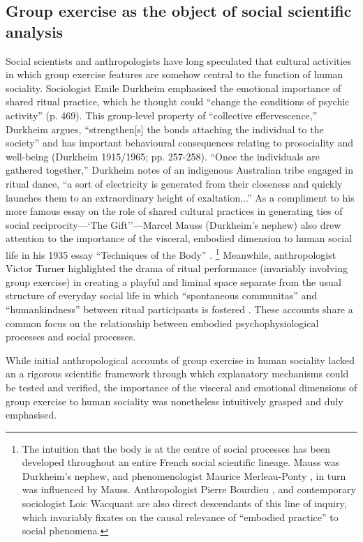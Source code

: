 \begin{CJK}{UTF8}{gbsn}
\subsection{Group exercise as the object of social scientific analysis\label{sect:GEsoSci}}
Social scientists and anthropologists have long speculated that cultural activities in which group exercise features are somehow central to the function of human sociality.  Sociologist Emile Durkheim emphasised the emotional importance of shared ritual practice, which he thought could ``change the conditions of psychic activity'' (p. 469).  This group-level property of ``collective effervescence,'' Durkheim argues, ``strengthen[s] the bonds attaching the individual to the society'' and has important behavioural consequences relating to prosociality and well-being (Durkheim 1915/1965; pp. 257-258). ``Once the individuals are gathered together,'' Durkheim notes of an indigenous Australian tribe engaged in ritual dance, ``a sort of electricity is generated from their closeness and quickly launches them to an extraordinary height of exaltation...''  As a compliment to his more famous essay on the role of shared cultural practices in generating ties of social reciprocity---`The Gift''---Marcel Mauss (Durkheim's nephew) also drew attention to the importance of the visceral, embodied dimension to human social life in his 1935 essay ``Techniques of the Body'' \citep{Mauss1935}.
    \footnote{The intuition that the body is at the centre of social processes has been developed throughout an entire French social scientific lineage.  Mauss was Durkheim's nephew, and phenomenologist Maurice Merleau-Ponty \citep{Merleau-Ponty1956}, in turn was influenced by Mauss.  Anthropologist Pierre Bourdieu \citep{Bourdieu1990}, and contemporary sociologist Loic Wacquant \citep{Wacquant2004} are also direct descendants of this line of inquiry, which invariably fixates on the causal relevance of ``embodied practice'' to social phenomena.}
Meanwhile, anthropologist Victor Turner highlighted the drama of ritual performance (invariably involving group exercise) in creating a playful and liminal space separate from the usual structure of everyday social life in which ``spontaneous communitas'' and ``humankindness'' between ritual participants is fostered \citep{Turner1974}.  These accounts share a common focus on the relationship between embodied psychophysiological processes and social processes.

While initial anthropological accounts of group exercise in human sociality lacked an a rigorous scientific framework through which explanatory mechanisms could be tested and verified, the importance of the visceral and emotional dimensions of group exercise to human sociality was nonetheless intuitively grasped and duly emphasised.


\end{CJK}
